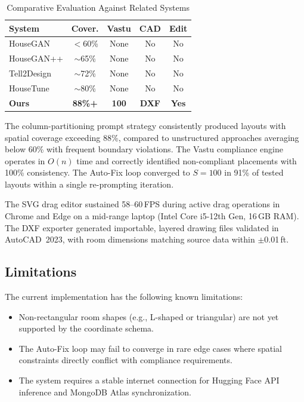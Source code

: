 \documentclass[10pt, twocolumn, letterpaper]{article}
\begin{document}
  \begin{table}[ht]
  \caption{Comparative Evaluation Against Related Systems}
  \label{tab:results}
  \centering
  \small
  \renewcommand{\arraystretch}{1.2}
  \begin{tabular}{|l|c|c|c|c|}
  \hline
  \textbf{System} & \textbf{Cover.} & \textbf{Vastu} & \textbf{CAD} & \textbf{Edit} \\
  \hline
  HouseGAN \cite{houseGAN}      & $<$60\%    & None    & No  & No  \\
  \hline
  HouseGAN++ \cite{houseGANpp}  & $\sim$65\% & None    & No  & No  \\
  \hline
  Tell2Design \cite{tell2design} & $\sim$72\% & None   & No  & No  \\
  \hline
  HouseTune \cite{housetune}    & $\sim$80\% & None    & No  & No  \\
  \hline
  \textbf{Ours}                 & \textbf{88\%+} & \textbf{100} & \textbf{DXF} & \textbf{Yes} \\
  \hline
  \end{tabular}
  \end{table}

  The column-partitioning prompt strategy consistently produced layouts with
  spatial coverage exceeding 88\%, compared to unstructured approaches averaging
  below 60\% with frequent boundary violations. The Vastu compliance engine
  operates in $O(n)$ time and correctly identified non-compliant placements with
  100\% consistency. The Auto-Fix loop converged to $S = 100$ in 91\% of tested
  layouts within a single re-prompting iteration.

  The SVG drag editor sustained 58--60\,FPS during active drag operations in
  Chrome and Edge on a mid-range laptop (Intel Core i5-12th Gen, 16\,GB RAM).
  The DXF exporter generated importable, layered drawing files validated in
  AutoCAD~2023, with room dimensions matching source data within $\pm$0.01\,ft.

  \subsection{Limitations}

  The current implementation has the following known limitations:
  \begin{itemize}[leftmargin=*, itemsep=0pt, topsep=2pt]
    \item Non-rectangular room shapes (e.g., L-shaped or triangular) are not
          yet supported by the coordinate schema.
    \item The Auto-Fix loop may fail to converge in rare edge cases where
          spatial constraints directly conflict with compliance requirements.
    \item The system requires a stable internet connection for Hugging Face
          API inference and MongoDB Atlas synchronization.
  \end{itemize}
\end{document}
